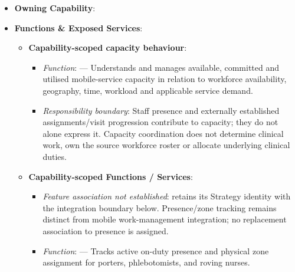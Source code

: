 \begin{itemize}

\item
\textbf{Owning Capability}: \texttt{}



\item
\textbf{Functions \& Exposed Services}:


\begin{itemize}

\item
\textbf{Capability-scoped capacity behaviour}:


\begin{itemize}

\item
\emph{Function}: \texttt{} — Understands and manages available, committed and utilised mobile-service capacity in relation to workforce availability, geography, time, workload and applicable service demand.



\item
\emph{Responsibility boundary}: Staff presence and externally established assignments/\allowbreak{}visit progression contribute to capacity; they do not alone express it. Capacity coordination does not determine clinical work, own the source workforce roster or allocate underlying clinical duties.



\end{itemize}


\item
\textbf{Capability-scoped Functions /\allowbreak{} Services}:


\begin{itemize}

\item
\emph{Feature association not established}: \texttt{} retains its Strategy identity with the integration boundary below. Presence/\allowbreak{}zone tracking remains distinct from mobile work-management integration; no replacement association to presence is assigned.



\item
\emph{Function}: \texttt{} — Tracks active on-duty presence and physical zone assignment for porters, phlebotomists, and roving nurses.




\end{itemize}
\end{itemize}
\end{itemize}
